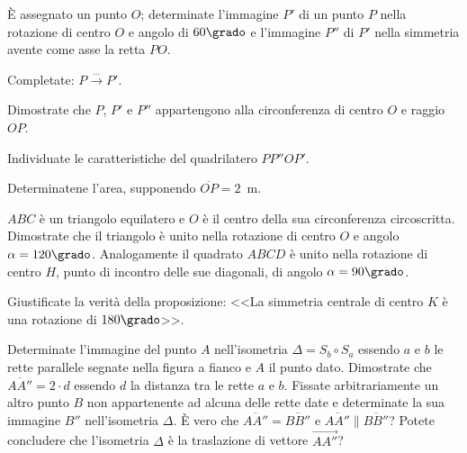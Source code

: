 \noindent\begin{minipage}{0.75\textwidth}\parindent15pt

\begin{esercizio}
\label{ese:8.66} %
\`E assegnato un punto $O$; determinate l'immagine $P'$ di un punto 
$P$ nella rotazione di centro $O$ e angolo di $60\grado$ e l'immagine 
$P''$ di $P'$ nella simmetria avente come asse la retta $PO$.
\begin{enumeratea}
\item Completate: $P \overset{\ldots{}}\longrightarrow P'$. 
\item Dimostrate che $P$, $P'$ e $P''$ appartengono alla 
circonferenza di centro $O$ e raggio $OP$.
\item Individuate le caratteristiche del quadrilatero $PP''OP'$.
\item Determinatene l'area, supponendo $\overline{OP}=2$~m.
\end{enumeratea}
\end{esercizio}

\begin{esercizio}
\label{ese:8.67} %
$ABC$ è un triangolo equilatero e $O$ è il centro della sua 
circonferenza circoscritta. Dimostrate che il triangolo è unito nella 
rotazione di centro $O$ e angolo $\alpha=120\grado$. Analogamente il 
quadrato $ABCD$ è unito nella rotazione di centro $H$, punto di 
incontro delle sue diagonali, di angolo $\alpha=90\grado$.
\end{esercizio}

\begin{esercizio}
\label{ese:8.68} %
Giustificate la verità della proposizione: <<La simmetria centrale di 
centro $K$ è una rotazione di $180\grado$>>.
\end{esercizio}

\begin{esercizio}
\label{ese:8.74} %
Determinate l'immagine del punto $A$ nell'isometria $\Delta=S_b \circ 
S_a$ essendo $a$ e $b$ le rette parallele segnate nella figura a 
fianco e $A$ il punto dato. Dimostrate che $\overline{AA''}=2\cdot d$ 
essendo $d$ la distanza tra le rette $a$ e $b$.
Fissate arbitrariamente un altro punto $B$ non appartenente ad alcuna 
delle rette date e determinate la sua immagine $B''$ nell'isometria 
$\Delta$.
\`E vero che $\overline{AA''}=\overline{BB''}$ e $\overline{AA''} 
\parallel \overline{BB''}$? Potete concludere che l'isometria 
$\Delta$ è la traslazione di vettore $\overrightarrow{AA''}$?
\end{esercizio}
\end{minipage}\hfil
\begin{minipage}{0.3\textwidth}
	\centering~~
\end{minipage}\vspace{8pt}

